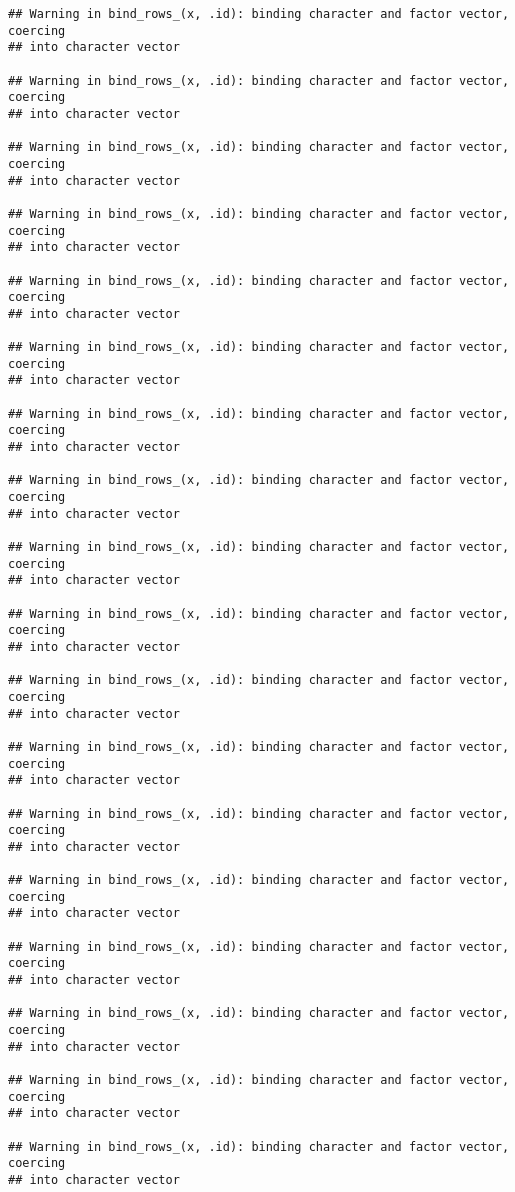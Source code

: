 \documentclass[
]{article}
\begin{document}
\begin{verbatim}
## Warning in bind_rows_(x, .id): binding character and factor vector, coercing
## into character vector

## Warning in bind_rows_(x, .id): binding character and factor vector, coercing
## into character vector

## Warning in bind_rows_(x, .id): binding character and factor vector, coercing
## into character vector

## Warning in bind_rows_(x, .id): binding character and factor vector, coercing
## into character vector

## Warning in bind_rows_(x, .id): binding character and factor vector, coercing
## into character vector

## Warning in bind_rows_(x, .id): binding character and factor vector, coercing
## into character vector

## Warning in bind_rows_(x, .id): binding character and factor vector, coercing
## into character vector

## Warning in bind_rows_(x, .id): binding character and factor vector, coercing
## into character vector

## Warning in bind_rows_(x, .id): binding character and factor vector, coercing
## into character vector

## Warning in bind_rows_(x, .id): binding character and factor vector, coercing
## into character vector

## Warning in bind_rows_(x, .id): binding character and factor vector, coercing
## into character vector

## Warning in bind_rows_(x, .id): binding character and factor vector, coercing
## into character vector

## Warning in bind_rows_(x, .id): binding character and factor vector, coercing
## into character vector

## Warning in bind_rows_(x, .id): binding character and factor vector, coercing
## into character vector

## Warning in bind_rows_(x, .id): binding character and factor vector, coercing
## into character vector

## Warning in bind_rows_(x, .id): binding character and factor vector, coercing
## into character vector

## Warning in bind_rows_(x, .id): binding character and factor vector, coercing
## into character vector

## Warning in bind_rows_(x, .id): binding character and factor vector, coercing
## into character vector


\end{verbatim}
\end{document}
